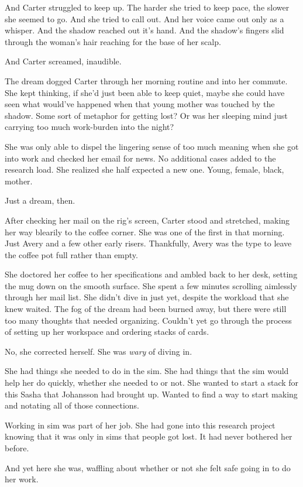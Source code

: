 And Carter struggled to keep up. The harder she tried to keep pace, the slower she seemed to go. And she tried to call out. And her voice came out only as a whisper. And the shadow reached out it's hand. And the shadow's fingers slid through the woman's hair reaching for the base of her scalp.

And Carter screamed, inaudible.

The dream dogged Carter through her morning routine and into her commute. She kept thinking, if she'd just been able to keep quiet, maybe she could have seen what would've happened when that young mother was touched by the shadow. Some sort of metaphor for getting lost? Or was her sleeping mind just carrying too much work-burden into the night?

She was only able to dispel the lingering sense of too much meaning when she got into work and checked her email for news. No additional cases added to the research load. She realized she half expected a new one. Young, female, black, mother.

Just a dream, then.

After checking her mail on the rig's screen, Carter stood and stretched, making her way blearily to the coffee corner. She was one of the first in that morning. Just Avery and a few other early risers. Thankfully, Avery was the type to leave the coffee pot full rather than empty.

She doctored her coffee to her specifications and ambled back to her desk, setting the mug down on the smooth surface. She spent a few minutes scrolling aimlessly through her mail list. She didn't dive in just yet, despite the workload that she knew waited. The fog of the dream had been burned away, but there were still too many thoughts that needed organizing. Couldn't yet go through the process of setting up her workspace and ordering stacks of cards.

No, she corrected herself. She was \emph{wary} of diving in.

She had things she needed to do in the sim. She had things that the sim would help her do quickly, whether she needed to or not. She wanted to start a stack for this Sasha that Johansson had brought up. Wanted to find a way to start making and notating all of those connections.

Working in sim was part of her job. She had gone into this research project knowing that it was only in sims that people got lost. It had never bothered her before.

And yet here she was, waffling about whether or not she felt safe going in to do her work.

